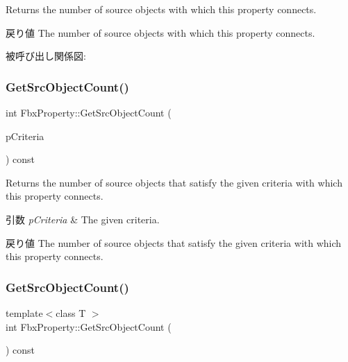 Returns the number of source objects with which this property connects. \begin{DoxyReturn}{戻り値}
The number of source objects with which this property connects. 
\end{DoxyReturn}
被呼び出し関係図\+:
\mbox{\label{class_fbx_property_ad90aa5b8d3fbe78a9bf541dcbcf9c210}} 
\subsubsection{\texorpdfstring{Get\+Src\+Object\+Count()}{GetSrcObjectCount()}\hspace{0.1cm}{\footnotesize\ttfamily [2/4]}}
{\footnotesize\ttfamily int Fbx\+Property\+::\+Get\+Src\+Object\+Count (\begin{DoxyParamCaption}\item[{const \hyperlink{class_fbx_criteria}{Fbx\+Criteria} \&}]{p\+Criteria }\end{DoxyParamCaption}) const}

Returns the number of source objects that satisfy the given criteria with which this property connects. 
\begin{DoxyParams}{引数}
{\em p\+Criteria} & The given criteria. \\
\hline
\end{DoxyParams}
\begin{DoxyReturn}{戻り値}
The number of source objects that satisfy the given criteria with which this property connects. 
\end{DoxyReturn}
\mbox{\label{class_fbx_property_a876b4f2219a1ca16337f35b27a76eed4}} 
\subsubsection{\texorpdfstring{Get\+Src\+Object\+Count()}{GetSrcObjectCount()}\hspace{0.1cm}{\footnotesize\ttfamily [3/4]}}
{\footnotesize\ttfamily template$<$class T $>$ \\
int Fbx\+Property\+::\+Get\+Src\+Object\+Count (\begin{DoxyParamCaption}{ }\end{DoxyParamCaption}) const}

